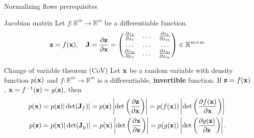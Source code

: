 \begin{frame}{Normalizing flows prerequisites}
	\begin{block}{Jacobian matrix}
		Let $f: \mathbb{R}^m \rightarrow \mathbb{R}^m$ be a differentiable function.
		\[
			\mathbf{z} = f(\mathbf{x}), \quad 
			\mathbf{J} =  \frac{\partial \mathbf{z}}{\partial \mathbf{x}} =
			\begin{pmatrix}
				\frac{\partial z_1}{\partial x_1} & \dots & \frac{\partial z_1}{\partial x_m} \\
				\dots & \dots & \dots \\ 
				\frac{\partial z_m}{\partial x_1} & \dots & \frac{\partial z_m}{\partial x_m}
			\end{pmatrix} \in \mathbb{R}^{m \times m}
		\]
		\vspace{-0.3cm}
	\end{block}
	\begin{block}{Change of variable theorem (CoV)}
		Let $\mathbf{x}$ be a random variable with density function $p(\mathbf{x})$ and $f: \mathbb{R}^m \rightarrow \mathbb{R}^m$ is a differentiable, \textbf{invertible} function. If $\mathbf{z} = f(\mathbf{x})$, $\mathbf{x} = f^{-1}(\mathbf{z}) = g(\mathbf{z})$, then
		\begin{align*}
			p(\mathbf{x}) &= p(\mathbf{z}) |\det(\mathbf{J}_f)| = p(\mathbf{z}) \left|\det \left(  \frac{\partial \mathbf{z}}{\partial \mathbf{x}} \right) \right| = p(f(\mathbf{x})) \left|\det \left(  \frac{\partial f(\mathbf{x})}{\partial \mathbf{x}} \right) \right| \\
			p(\mathbf{z}) &= p(\mathbf{x}) |\det(\mathbf{J}_g)|= p(\mathbf{x}) \left|\det \left(  \frac{\partial \mathbf{x}}{\partial \mathbf{z}} \right) \right| = p(g(\mathbf{z})) \left|\det \left(  \frac{\partial g(\mathbf{z})}{\partial \mathbf{z}} \right) \right|.
		\end{align*}
		\vspace{-0.5cm}
	\end{block}
\end{frame}
